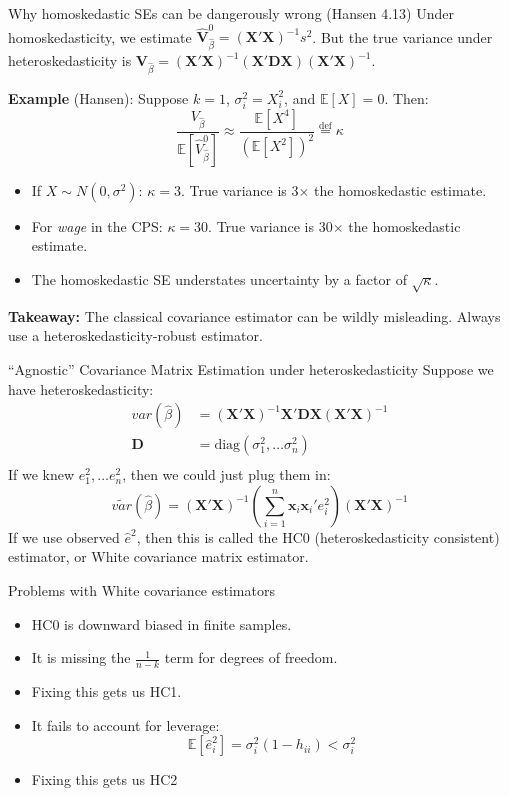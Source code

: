\documentclass[aspectratio=169]{beamer}
\numberwithin{equation}{section}
\begin{document}
\begin{frame}{Why homoskedastic SEs can be dangerously wrong (Hansen 4.13)}
Under homoskedasticity, we estimate $\hat{\bm{V}}^0_{\hat{\beta}}=(\bm{X'X})^{-1}s^2$.
But the \alert{true} variance under heteroskedasticity is
$\bm{V}_{\hat{\beta}}=(\bm{X'X})^{-1}(\bm{X'DX})(\bm{X'X})^{-1}$.\pause

\medskip
\textbf{Example} (Hansen): Suppose $k=1$, $\sigma_i^2=X_i^2$, and $\mathbb{E}[X]=0$. Then:
$$\frac{V_{\hat{\beta}}}{\mathbb{E}\left[\hat{V}^0_{\hat{\beta}}\right]}\approx \frac{\mathbb{E}[X^4]}{(\mathbb{E}[X^2])^2}\stackrel{\text{def}}{=}\kappa$$\pause
\begin{itemize}
\item If $X\sim N(0,\sigma^2)$: $\kappa=3$. True variance is \alert{3$\times$} the homoskedastic estimate.
\item For \emph{wage} in the CPS: $\kappa=30$. True variance is \alert{30$\times$} the homoskedastic estimate.
\item The homoskedastic SE understates uncertainty by a factor of $\sqrt{\kappa}$.
\end{itemize}\pause
\smallskip
\textbf{Takeaway:} The classical covariance estimator can be wildly misleading.  Always use a heteroskedasticity-robust estimator.
\end{frame}

\begin{frame}{``Agnostic'' Covariance Matrix Estimation under heteroskedasticity}
Suppose we have heteroskedasticity:
\begin{align*}
var(\hat{\beta})&=(\bm{X'X})^{-1}\bm{X'}\bm{D}\bm{X}(\bm{X'X})^{-1}\\
\bm{D}&=\text{diag}(\sigma_1^2,\ldots \sigma_n^2)\\
\end{align*}\pause
If we knew $e_1^2,\ldots e_n^2$, then we could just plug them in:
$$\tilde{var}(\hat{\beta})=(\bm{X'X})^{-1}(\sum_{i=1}^n \bm{x}_i\bm{x}_i'e_i^2)(\bm{X'X})^{-1}$$
If we use observed $\hat{e}^2$, then this is called the HC0 (heteroskedasticity consistent) estimator, or White covariance matrix estimator.  
\end{frame}

\begin{frame}{Problems with White covariance estimators}
\begin{itemize}
\item HC0 is downward biased in finite samples.
\item It is missing the $\frac{1}{n-k}$ term for degrees of freedom. 
\item[$\rightarrow$] Fixing this gets us HC1.
\item It fails to account for leverage:
$$\mathbb{E}[\hat{e}_i^2]=\sigma^2_i(1-h_{ii})<\sigma^2_i$$
\item[$\rightarrow$] Fixing this gets us HC2
\end{itemize}
\end{frame}
\end{document}
